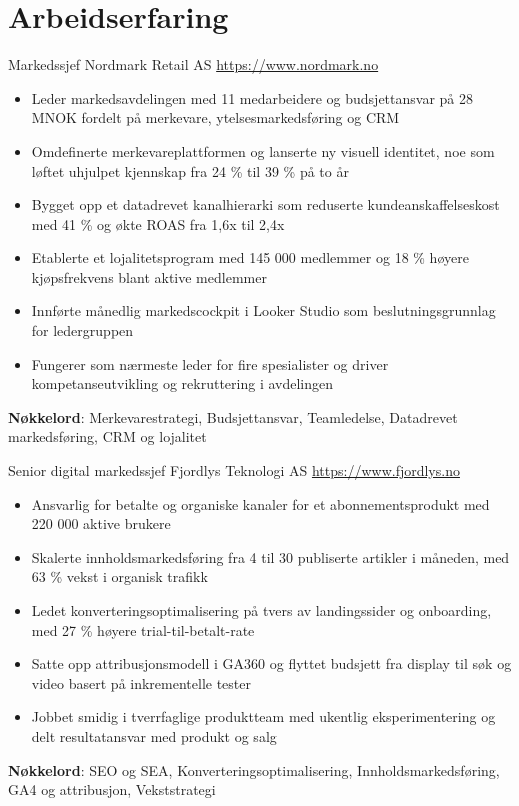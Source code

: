 \documentclass[a4paper, serif, 10pt]{moderncv}
\begin{document}
\section{Arbeidserfaring}

        {Markedssjef}
        {Nordmark Retail AS}
        {\url{https://www.nordmark.no}}
        {}
        {\begin{itemize}
\item Leder markedsavdelingen med 11 medarbeidere og budsjettansvar på 28 MNOK fordelt på merkevare, ytelsesmarkedsføring og CRM
\item Omdefinerte merkevareplattformen og lanserte ny visuell identitet, noe som løftet uhjulpet kjennskap fra 24 \% til 39 \% på to år
\item Bygget opp et datadrevet kanalhierarki som reduserte kundeanskaffelseskost med 41 \% og økte ROAS fra 1,6x til 2,4x
\item Etablerte et lojalitetsprogram med 145 000 medlemmer og 18 \% høyere kjøpsfrekvens blant aktive medlemmer
\item Innførte månedlig markedscockpit i Looker Studio som beslutningsgrunnlag for ledergruppen
\item Fungerer som nærmeste leder for fire spesialister og driver kompetanseutvikling og rekruttering i avdelingen
\end{itemize}
\textbf{Nøkkelord}: Merkevarestrategi, Budsjettansvar, Teamledelse, Datadrevet markedsføring, CRM og lojalitet}

        {Senior digital markedssjef}
        {Fjordlys Teknologi AS}
        {\url{https://www.fjordlys.no}}
        {}
        {\begin{itemize}
\item Ansvarlig for betalte og organiske kanaler for et abonnementsprodukt med 220 000 aktive brukere
\item Skalerte innholdsmarkedsføring fra 4 til 30 publiserte artikler i måneden, med 63 \% vekst i organisk trafikk
\item Ledet konverteringsoptimalisering på tvers av landingssider og onboarding, med 27 \% høyere trial-til-betalt-rate
\item Satte opp attribusjonsmodell i GA360 og flyttet budsjett fra display til søk og video basert på inkrementelle tester
\item Jobbet smidig i tverrfaglige produktteam med ukentlig eksperimentering og delt resultatansvar med produkt og salg
\end{itemize}
\textbf{Nøkkelord}: SEO og SEA, Konverteringsoptimalisering, Innholdsmarkedsføring, GA4 og attribusjon, Vekststrategi}
\end{document}
